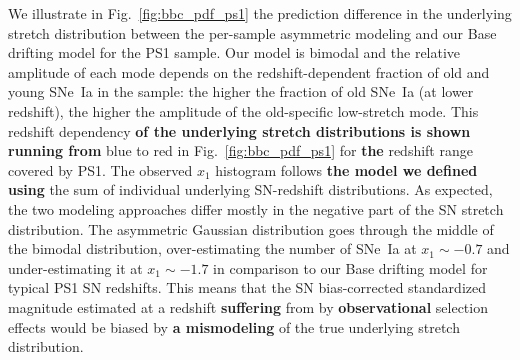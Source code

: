 \documentclass[]{aa}
\begin{document}
We illustrate in Fig.~\ref{fig:bbc_pdf_ps1} the prediction difference in the
underlying stretch distribution between the per-sample asymmetric modeling and
our Base drifting model for the PS1 sample. Our model is bimodal and the
relative amplitude of each mode depends on the redshift-dependent fraction of
old and young SNe~Ia in the sample: the higher the fraction of old SNe~Ia (at
lower redshift), the higher the amplitude of the old-specific low-stretch mode.
This redshift dependency \textbf{of the underlying stretch distributions is
shown running from} blue to red in Fig.~\ref{fig:bbc_pdf_ps1} for \textbf{the}
redshift range covered by PS1. The observed $x_1$ histogram follows \textbf{the
model we defined using} the sum of individual underlying SN-redshift
distributions. As expected, the two modeling approaches differ mostly in the
negative part of the SN stretch distribution. The asymmetric Gaussian
distribution goes through the middle of the bimodal distribution,
over-estimating the number of SNe~Ia at $x_1\sim-0.7$ and under-estimating it at
$x_1\sim-1.7$ in comparison to our Base drifting model for typical PS1 SN
redshifts. This means that the SN bias-corrected standardized magnitude
estimated at a redshift \textbf{suffering} from by \textbf{observational}
selection effects would be biased by \textbf{a mismodeling} of the true
underlying stretch distribution.
\end{document}

